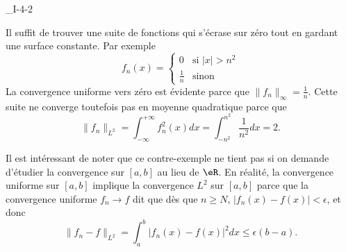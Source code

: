 

\begin{corrige}{_I-4-2}

Il suffit de trouver une suite de fonctions qui s'écrase sur zéro tout en gardant une surface constante. Par exemple
\begin{equation}
	f_n(x)=
\begin{cases}
	0	&	\text{si $| x |>n^2$}\\
	\frac{ 1 }{ n }	&	 \text{sinon}
\end{cases}
\end{equation}
La convergence uniforme vers zéro est évidente parce que $\| f_n \|_{\infty}=\frac{1}{ n }$. Cette suite ne converge toutefois pas en moyenne quadratique parce que
\begin{equation}
	\| f_n \|_{L^2}=\int_{-\infty}^{+\infty}f_n^2(x)dx=\int_{-n^2}^{n^2}\frac{1}{ n^2 }dx=2.
\end{equation}

Il est intéressant de noter que ce contre-exemple ne tient pas si on demande d'étudier la convergence sur $[a,b]$ au lieu de $\eR$. En réalité, la convergence uniforme sur $[a,b]$ implique la convergence $L^2$ sur $[a,b]$ parce que la convergence uniforme $f_n\to f$ dit que dès que $n\geq N$, $| f_n(x)-f(x) |<\epsilon$, et donc
\begin{equation}
	\| f_n-f \|_{L^2}=\int_a^b| f_n(x)-f(x) |^2dx\leq\epsilon(b-a).
\end{equation}

\end{corrige}

